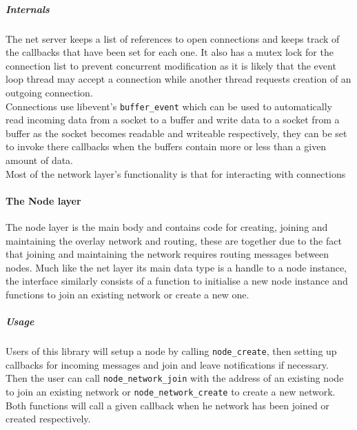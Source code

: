 \documentclass{article}
\begin{document}
\subparagraph{Internals}
The net server keeps a list of references to open connections and keeps track of the callbacks that have been set for each one. It also has a mutex lock for the connection list to prevent concurrent modification as it is likely that the event loop thread may accept a connection while another thread requests creation of an outgoing connection.
\\
Connections use libevent's \texttt{buffer\_event} which can be used to automatically read incoming data from a socket to a buffer and write data to a socket from a buffer as the socket becomes readable and writeable respectively, they can be set to invoke there callbacks when the buffers contain more or less than a given amount of data.
\\
Most of the network layer's functionality is that for interacting with connections

\paragraph{The Node layer}
The node layer is the main body and contains code for creating, joining and maintaining the overlay network  and routing, these are together due to the fact that joining and maintaining the network requires routing messages between nodes. Much like the net layer its main data type is a handle to a node instance, the interface similarly consists of a function to initialise a new node instance and functions to join an existing network or create a new one. 


\subparagraph{Usage}
Users of this library will setup a node by calling \texttt{node\_create}, then setting up callbacks for incoming messages and join and leave notifications if necessary.
\\
Then the user can call \texttt{node\_network\_join} with the address of an existing node to join an existing network or \texttt{node\_network\_create} to create a new network. Both functions will call a given callback when he network has been joined or created respectively.
\end{document}
